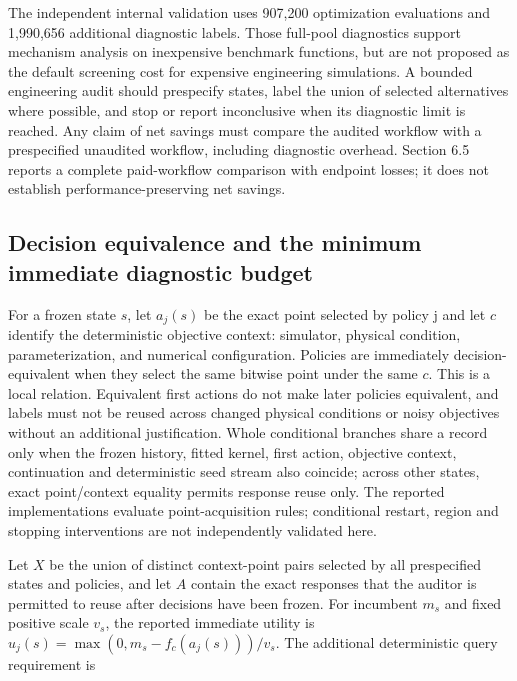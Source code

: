 \documentclass[]{interact}
\begin{document}
The independent internal validation uses 907,200 optimization evaluations and 1,990,656 additional diagnostic labels. Those full-pool diagnostics support mechanism analysis on inexpensive benchmark functions, but are not proposed as the default screening cost for expensive engineering simulations. A bounded engineering audit should prespecify states, label the union of selected alternatives where possible, and stop or report inconclusive when its diagnostic limit is reached. Any claim of net savings must compare the audited workflow with a prespecified unaudited workflow, including diagnostic overhead. Section 6.5 reports a complete paid-workflow comparison with endpoint losses; it does not establish performance-preserving net savings.

\hypertarget{decision-equivalence-and-the-minimum-immediate-diagnostic-budget}{%
\subsection{Decision equivalence and the minimum immediate diagnostic budget}\label{decision-equivalence-and-the-minimum-immediate-diagnostic-budget}}

For a frozen state \(s\), let \(a_j(s)\) be the exact point selected by policy j and let \(c\) identify the deterministic objective context: simulator, physical condition, parameterization, and numerical configuration. Policies are immediately decision-equivalent when they select the same bitwise point under the same \(c\). This is a local relation. Equivalent first actions do not make later policies equivalent, and labels must not be reused across changed physical conditions or noisy objectives without an additional justification. Whole conditional branches share a record only when the frozen history, fitted kernel, first action, objective context, continuation and deterministic seed stream also coincide; across other states, exact point/context equality permits response reuse only. The reported implementations evaluate point-acquisition rules; conditional restart, region and stopping interventions are not independently validated here.

Let \(X\) be the union of distinct context-point pairs selected by all prespecified states and policies, and let \(A\) contain the exact responses that the auditor is permitted to reuse after decisions have been frozen. For incumbent \(m_s\) and fixed positive scale \(v_s\), the reported immediate utility is \(u_j(s)=\max(0,m_s-f_c(a_j(s)))/v_s\). The additional deterministic query requirement is
\end{document}
